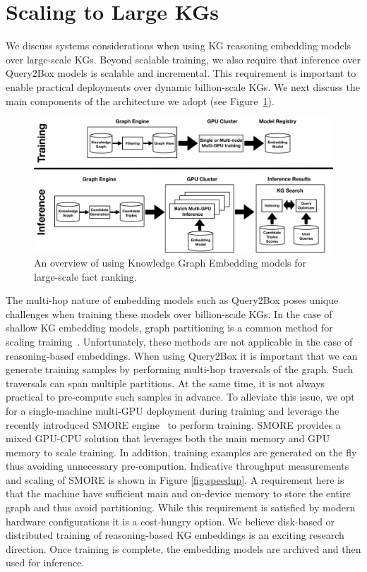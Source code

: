 \section{Scaling to Large KGs}\label{sec:system}
We discuss systems considerations when using KG reasoning embedding models over large-scale KGs. Beyond scalable training, we also require that inference over Query2Box models is scalable and incremental. This requirement is important to enable practical deployments over dynamic billion-scale KGs. We next discuss the main components of the architecture we adopt (see Figure~\ref{fig:sys_overview}).

 \begin{figure}
        \centering
      \includegraphics[width=0.7\columnwidth]{submissions/Ali2023/figures/embedding_models_q2box_v2.pdf}
      \caption{An overview of using Knowledge Graph Embedding models for large-scale fact ranking.}
    \label{fig:sys_overview}
\end{figure}

The multi-hop nature of embedding models such as Query2Box poses unique challenges when training these models over billion-scale KGs. In the case of shallow KG embedding models, graph partitioning is a common method for scaling training~\cite{zhu2019graphvite, lerer2019pytorch}. Unfortunately, these methods are not applicable in the case of reasoning-based embeddings. When using Query2Box it is important that we can generate training samples by performing multi-hop traversals of the graph. Such traversals can span multiple partitions. At the same time, it is not always practical to pre-compute such samples in advance. To alleviate this issue, we opt for a single-machine multi-GPU deployment during training and leverage the recently introduced SMORE engine~\cite{ren2021smore} to perform training. SMORE provides a mixed GPU-CPU solution that leverages both the main memory and GPU memory to scale training. In addition, training examples are generated on the fly thus avoiding unnecessary pre-compution. Indicative throughput measurements and scaling of SMORE is shown in Figure \ref{fig:speedup}. A requirement here is that the machine have sufficient main and on-device memory to store the entire graph and thus avoid partitioning. While this requirement is satisfied by modern hardware configurations it is a cost-hungry option. We believe disk-based or distributed training of reasoning-based KG embeddings is an exciting research direction. Once training is complete, the embedding models are archived and then used for inference.

